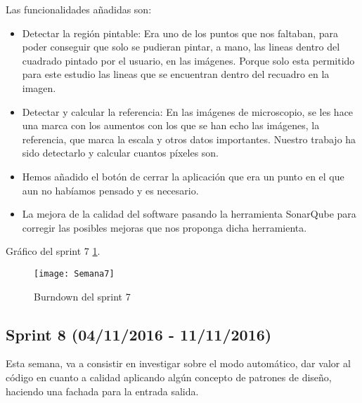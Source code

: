 Las funcionalidades añadidas son:
\begin{itemize}
	\item Detectar la región pintable: Era uno de los puntos que nos faltaban, para poder conseguir que solo se pudieran pintar, a mano, las lineas dentro del cuadrado pintado por el usuario, en las imágenes. Porque solo esta permitido para este estudio las lineas que se encuentran dentro del recuadro en la imagen.
	\item Detectar y calcular la referencia: En las imágenes de microscopio, se les hace una marca con los aumentos con los que se han echo las imágenes, la referencia, que marca la escala y otros datos importantes.
	Nuestro trabajo ha sido detectarlo y calcular cuantos píxeles son.
	
	\item Hemos añadido el botón de cerrar la aplicación que era un punto en el que aun no habíamos pensado y es necesario.
	
	\item La mejora de la calidad del software pasando la herramienta SonarQube para corregir las posibles mejoras que nos proponga dicha herramienta. 
\end{itemize}

Gráfico del sprint 7 \ref{fig:A.2.7}.
\begin{figure}[h]
\centering
\texttt{[image: Semana7]}
\caption{Burndown del sprint 7}
\label{fig:A.2.7}
\end{figure}

\subsection{Sprint 8 (04/11/2016 - 11/11/2016)}
Esta semana, va a consistir en investigar sobre el modo automático, dar valor al código en cuanto a calidad aplicando algún concepto de patrones de diseño, haciendo una fachada para la entrada salida.

